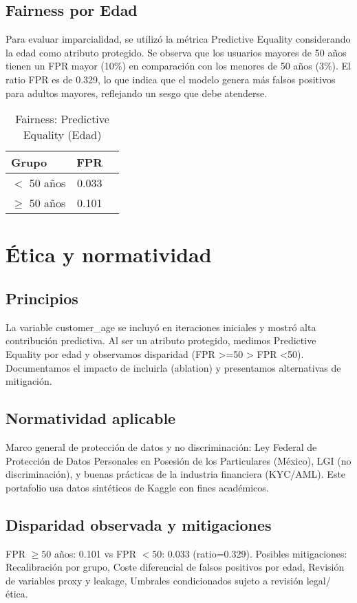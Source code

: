 \documentclass[runningheads]{llncs}
\begin{document}
\subsection{Fairness por Edad}
Para evaluar imparcialidad, se utilizó la métrica Predictive Equality considerando la edad como atributo protegido. 
Se observa que los usuarios mayores de 50 años tienen un FPR mayor (10\%) en comparación con los menores de 50 años (3\%). 
El ratio FPR es de 0.329, lo que indica que el modelo genera más falsos positivos para adultos mayores, reflejando un sesgo que debe atenderse.

\begin{table}[!ht]
\centering
\caption{Fairness: Predictive Equality (Edad)}
\label{tab:fairness}
\begin{tabular}{lcc}
\toprule
Grupo & FPR \\
\midrule
$<$ 50 años & 0.033 \\
$\geq$ 50 años & 0.101 \\
\bottomrule
\end{tabular}
\end{table}


\section{Ética y normatividad}
\subsection{Principios}
La variable customer\_age se incluyó en iteraciones iniciales y mostró alta contribución predictiva. 
Al ser un atributo protegido, medimos Predictive Equality por edad y observamos disparidad (FPR >=50 > FPR <50).
Documentamos el impacto de incluirla (ablation) y presentamos alternativas de mitigación.

\subsection{Normatividad aplicable}
Marco general de protección de datos y no discriminación:
Ley Federal de Protección de Datos Personales en Posesión de los Particulares (México),
LGI (no discriminación),
y buenas prácticas de la industria financiera (KYC/AML). 
Este portafolio usa datos sintéticos de Kaggle con fines académicos.

\subsection{Disparidad observada y mitigaciones}
FPR $\geq 50$ años: 0.101 vs FPR $<50$: 0.033 (ratio=0.329). 
Posibles mitigaciones: 
Recalibración por grupo,
Coste diferencial de falsos positivos por edad,
Revisión de variables proxy y leakage,
Umbrales condicionados sujeto a revisión legal/ética.
\end{document}
